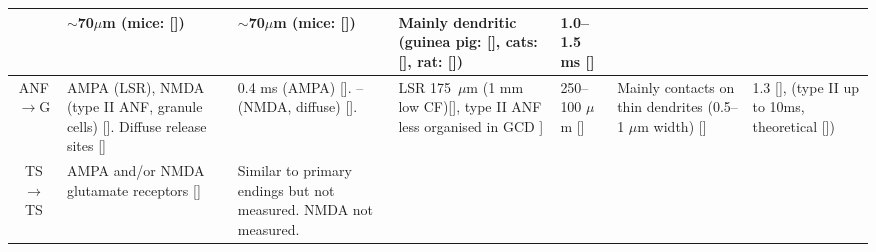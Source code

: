 \begin{longtable}{cYYYYYY}
                                & %
$\sim$70$\mu$m (mice: [])
                                & %
$\sim$70$\mu$m (mice: [])
                                & %
Mainly dendritic (guinea pig: [], cats: [], rat: [])
                                & %
1.0--1.5 ms []
\\ \midrule
ANF\ensuremath{\rightarrow}G                      
                                & %
AMPA (LSR), NMDA (type II ANF, granule cells)
[].
Diffuse release sites []             
                                & %
0.4 ms (AMPA)   []. 
-- (NMDA, diffuse) [].    
                                & %
LSR 175~$\mu$m (1 mm low CF)[], type II ANF less organised in GCD ]
                                & %
250--100 $\mu$m []                     
                                & 
Mainly contacts on thin dendrites (0.5--1 $\mu$m width)  []                
                                & %
1.3 [], 
(type II up to 10ms, theoretical [])
\\ \midrule
TS\ensuremath{\rightarrow}TS                        
                                & %
AMPA and/or NMDA glutamate receptors []        
                                & %
Similar to primary endings but not measured.  
NMDA not measured.           
                                & 

\end{longtable}
